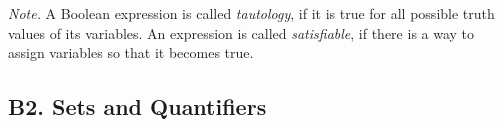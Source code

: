 \documentclass[jou]{apa6}
\begin{document}
{\em Note.} A Boolean expression is called {\em tautology}, 
if it is true for all 
possible truth values of its variables. 
An expression is called {\em satisfiable}, 
if there is a way to assign 
variables so that it becomes true. 





\subsection{B2. Sets and Quantifiers}






















\end{document}
